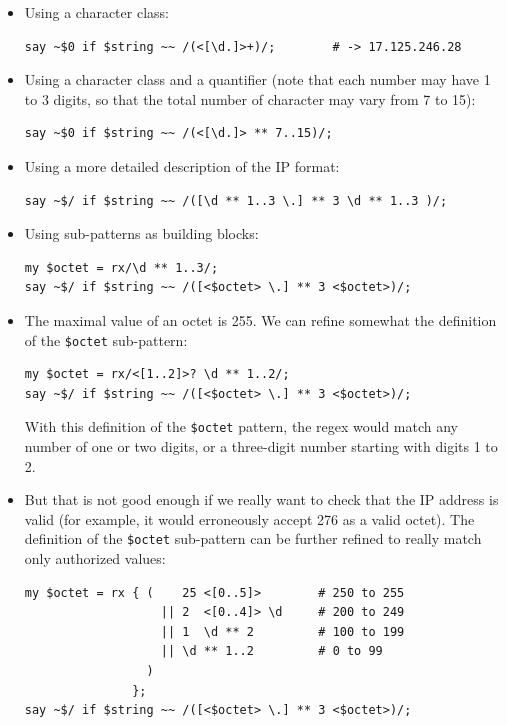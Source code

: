 \begin{itemize} 	

\item Using a character class:

\begin{verbatim}
say ~$0 if $string ~~ /(<[\d.]>+)/;        # -> 17.125.246.28
\end{verbatim}
%

\item Using a character class and a quantifier (note that 
each number may have 1 to 3 digits, so that the total number 
of character may vary from 7 to 15):

\begin{verbatim}
say ~$0 if $string ~~ /(<[\d.]> ** 7..15)/;  
\end{verbatim}
%

\item Using a more detailed description of the IP format:
\begin{verbatim}
say ~$/ if $string ~~ /([\d ** 1..3 \.] ** 3 \d ** 1..3 )/;
\end{verbatim}
%

\item Using sub-patterns as building blocks:
\begin{verbatim}
my $octet = rx/\d ** 1..3/;
say ~$/ if $string ~~ /([<$octet> \.] ** 3 <$octet>)/;
\end{verbatim}
%

\item The maximal value of an octet is 255. We can 
refine somewhat the definition of the \verb'$octet' 
sub-pattern:
\begin{verbatim}
my $octet = rx/<[1..2]>? \d ** 1..2/;
say ~$/ if $string ~~ /([<$octet> \.] ** 3 <$octet>)/;
\end{verbatim}
%
With this definition of the \verb'$octet' pattern, the 
regex would match any number of one or two digits, or a 
three-digit number starting with digits 1 to 2.

\item But that is not good enough if we really want to check 
that the IP address is valid (for example, it would erroneously 
accept 276 as a valid octet). The definition of the 
\verb'$octet' sub-pattern can be further refined to 
really match only authorized values:

\begin{verbatim}
my $octet = rx { (    25 <[0..5]>        # 250 to 255
                   || 2  <[0..4]> \d     # 200 to 249
                   || 1  \d ** 2         # 100 to 199
                   || \d ** 1..2         # 0 to 99 
                 )
               };
say ~$/ if $string ~~ /([<$octet> \.] ** 3 <$octet>)/;
\end{verbatim}
%


\end{itemize}
